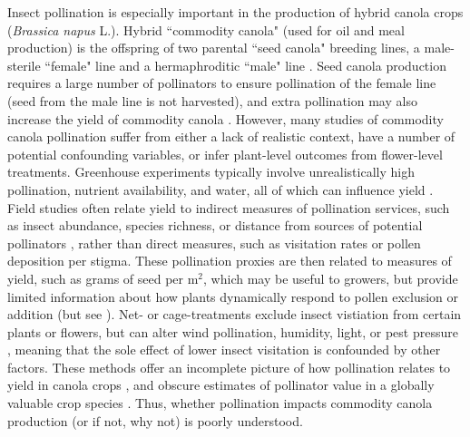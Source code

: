 \documentclass[12pt]{article} %
\begin{document}
Insect pollination is especially important in the production of hybrid canola crops (\textit{Brassica napus} L.).
Hybrid ``commodity canola" (used for oil and meal production) is the offspring of two parental ``seed canola" breeding lines, a male-sterile ``female" line and a hermaphroditic  ``male" line \citep{westcott2001,steffan2003,clay2009}. 
Seed canola production requires a large number of pollinators to ensure pollination of the female line (seed from the male line is not harvested), and extra pollination may also increase the yield of commodity canola \citep{morandin2005,rader_phd,bommarco2012,bartomeus2015,perrot2018}. 
However, many studies of commodity canola pollination suffer from either a lack of realistic context, have a number of potential confounding variables, or infer plant-level outcomes from flower-level treatments. 
Greenhouse experiments typically involve unrealistically high pollination, nutrient availability, and water, all of which can influence yield \citep{bartomeus2015,marini2015}.
Field studies often relate yield to indirect measures of pollination services, such as insect abundance, species richness, or distance from sources of potential pollinators \citep{morandin2005,ricketts2008}, rather than direct measures, such as visitation rates or pollen deposition per stigma.
These pollination proxies are then related to measures of yield, such as grams of seed per m$^2$, which may be useful to growers, but provide limited information about how plants dynamically respond to pollen exclusion or addition (but see \citealp{sabbahi2005}).
Net- or cage-treatments exclude insect vistiation from certain plants or flowers, but can alter wind pollination, humidity, light, or pest pressure \citep{olsson1960, neal2004, jauker2008}, meaning that the sole effect of lower insect visitation is confounded by other factors.
These methods offer an incomplete picture of how pollination relates to yield in canola crops \citep{ouvrard2019}, and obscure estimates of pollinator value in a globally valuable crop species \citep{melathopoulos2015}. 
Thus, whether pollination impacts commodity canola production (or if not, why not) is poorly understood.
\end{document}
